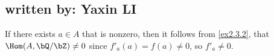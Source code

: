 \subsection{written by: Yaxin LI}
If there exists $a\in A$ that is nonzero, then it follows from \ref{ex2.3.2}, that $\Hom(A,\bQ/\bZ)\ne0$ since $f'_a(a)=f(a)\ne0$, so $f'_a\ne0$.